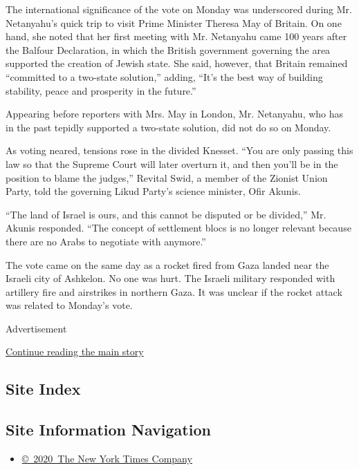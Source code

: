The international significance of the vote on Monday was underscored
during Mr. Netanyahu's quick trip to visit Prime Minister Theresa May of
Britain. On one hand, she noted that her first meeting with Mr.
Netanyahu came 100 years after the Balfour Declaration, in which the
British government governing the area supported the creation of Jewish
state. She said, however, that Britain remained ``committed to a
two-state solution,'' adding, ``It's the best way of building stability,
peace and prosperity in the future.''

Appearing before reporters with Mrs. May in London, Mr. Netanyahu, who
has in the past tepidly supported a two-state solution, did not do so on
Monday.

As voting neared, tensions rose in the divided Knesset. ``You are only
passing this law so that the Supreme Court will later overturn it, and
then you'll be in the position to blame the judges,'' Revital Swid, a
member of the Zionist Union Party, told the governing Likud Party's
science minister, Ofir Akunis.

``The land of Israel is ours, and this cannot be disputed or be
divided,'' Mr. Akunis responded. ``The concept of settlement blocs is no
longer relevant because there are no Arabs to negotiate with anymore.''

The vote came on the same day as a rocket fired from Gaza landed near
the Israeli city of Ashkelon. No one was hurt. The Israeli military
responded with artillery fire and airstrikes in northern Gaza. It was
unclear if the rocket attack was related to Monday's vote.

Advertisement

\protect\hyperlink{after-bottom}{Continue reading the main story}

\hypertarget{site-index}{%
\subsection{Site Index}\label{site-index}}

\hypertarget{site-information-navigation}{%
\subsection{Site Information
Navigation}\label{site-information-navigation}}

\begin{itemize}
\tightlist
\item
  \href{https://help.nytimes.com/hc/en-us/articles/115014792127-Copyright-notice}{©~2020~The
  New York Times Company}
\end{itemize}


